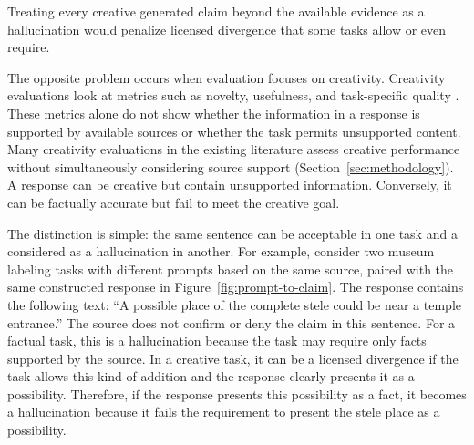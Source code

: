 \documentclass{clv2025}
\begin{document}
Treating every creative generated claim beyond the available evidence as a
hallucination would penalize licensed divergence that some tasks allow or even require.

The opposite problem occurs when evaluation focuses on creativity.
Creativity evaluations look at metrics such as novelty, usefulness, and
task-specific quality
\citep{runco_standard_2012,hou_creativityprism_2025,zhao_assessing_2025}.
These metrics alone do not show whether the information in a response is
supported by available sources or whether the task permits unsupported
content.
Many creativity evaluations in the existing literature assess creative performance without simultaneously considering source support (Section~\ref{sec:methodology}).
A response can be creative but contain unsupported
information. Conversely, it can be factually accurate but fail to meet the creative goal.


The distinction is simple: the same sentence can be acceptable in one task and
a considered as a hallucination in another. For example, consider two museum labeling tasks with different prompts based on the same
source, paired with the same constructed response in Figure~\ref{fig:prompt-to-claim}. 
The response contains the following text: ``A possible place of the complete stele could be  near a temple entrance.'' The source does not confirm or deny the claim in this 
sentence.
For a factual task, this is a hallucination because the task may require only
facts supported by the source. In a creative task, it can be a licensed divergence
if the task allows this kind of addition and the response clearly presents it
as a possibility.
Therefore, if the response presents this possibility as a fact, it becomes a hallucination
because it fails the requirement to present the stele place as a possibility.
\end{document}
